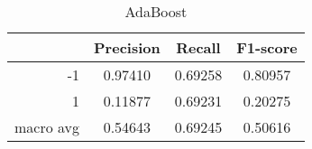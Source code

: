 \begin{table}[!h]
    \centering
    \renewcommand{\arraystretch}{1.5}
    \begin{tabular}{|r|c|c|c|}
        \hline
                  & Precision & Recall & F1-score \\ \hline
        -1        &     0.97410     &     0.69258   &    0.80957      \\ \hline
        1         &     0.11877      &     0.69231   &   0.20275       \\ \hline
        macro avg &      0.54643     &     0.69245   &    0.50616      \\ \hline
    \end{tabular}
    \caption{AdaBoost}
\end{table}
